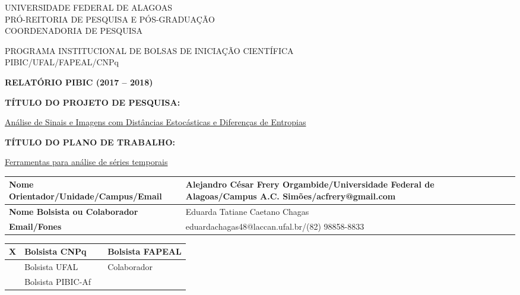 \documentclass[12pt,letterpaper]{article}
\begin{document}
\onehalfspacing 
\thispagestyle{empty}
\begin{center}
\vspace{0.2cm}

\hrulefill

UNIVERSIDADE FEDERAL DE ALAGOAS\\
PRÓ-REITORIA DE PESQUISA E PÓS-GRADUAÇÃO\\
COORDENADORIA DE PESQUISA

\hrulefill

\vspace{0.5cm}

PROGRAMA INSTITUCIONAL DE BOLSAS DE INICIAÇÃO CIENTÍFICA\\PIBIC/UFAL/FAPEAL/CNPq

\vspace{1.0cm}

\textbf{\Large{RELATÓRIO PIBIC (2017 -- 2018)}}\\

\end{center}

\vspace{1.2cm}

\textbf{TÍTULO DO PROJETO DE PESQUISA:}

\underline{Análise de Sinais e Imagens com Distâncias Estocásticas e Diferenças de Entropias}

\textbf{TÍTULO DO PLANO DE TRABALHO:}

\underline{Ferramentas para análise de séries temporais}

\vspace{1cm}

\begin{table}[!h]
\begin{center}
\begin{tabularx}{\textwidth}{|X|X|X|}
\hline                              
\textbf{Nome Orientador/Unidade/Campus/Email} &  Alejandro César Frery Orgambide/Universidade Federal de Alagoas/Campus A.C. Simões/acfrery@gmail.com\\
\hline     
\textbf{Nome Bolsista ou Colaborador} & Eduarda Tatiane Caetano Chagas\\
\hline     
\textbf{Email/Fones} & eduardachagas48@laccan.ufal.br/(82) 98858-8833\\
\hline     
\end{tabularx}
\end{center}
\end{table}

\begin{table}[!h]
\begin{center}
\begin{tabularx}{\textwidth}{|X|X|X|X|}
\hline                              
\hspace{1.3cm} X & Bolsista CNPq &  &Bolsista FAPEAL\\
\hline             
& Bolsista UFAL &  &Colaborador\\
\hline             
& Bolsista PIBIC-Af&  &\\
\hline     
\end{tabularx}
\end{center}
\end{table}
\end{document}
